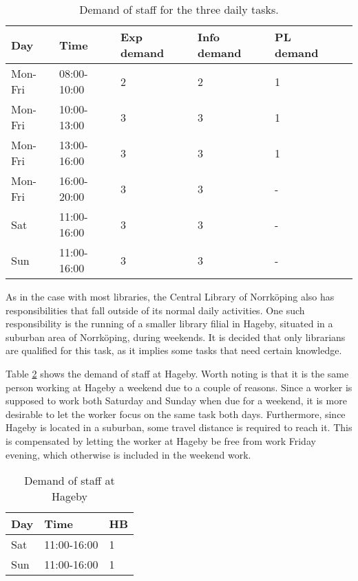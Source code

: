 \begin{table}[h]
\centering
\caption{Demand of staff for the three daily tasks.}
\label{tab:Outer_Task_Demand}
\begin{tabularx}{\textwidth}{|X|l|l|l|l|X|}
\hline
\textbf{Day} & \textbf{Time} & \textbf{Exp demand} & \textbf{Info demand} & \textbf{PL demand}
\\ \hline 
Mon-Fri & 08:00-10:00 & 2 & 2 & 1
\\ \hline 
Mon-Fri & 10:00-13:00 & 3 & 3 & 1
\\ \hline 
Mon-Fri & 13:00-16:00  & 3 & 3 & 1
\\ \hline 
Mon-Fri & 16:00-20:00 & 3 & 3 & -
\\ \hline 
Sat & 11:00-16:00  & 3 & 3 & -
\\ \hline 
Sun & 11:00-16:00  & 3 & 3 & -
\\ \hline 
\end{tabularx}
\end{table} 


As in the case with most libraries, the Central Library of Norrköping also has responsibilities that fall outside of its normal daily activities. One such responsibility is the running of a smaller library filial in Hageby, situated in a suburban area of Norrköping, during weekends. It is decided that only librarians are qualified for this task, as it implies some tasks that need certain knowledge.

Table \ref{tab:Hageby_Demand} shows the demand of staff at Hageby. Worth noting is that it is the same person working at Hageby a weekend due to a couple of reasons. Since a worker is supposed to work both Saturday and Sunday when due for a weekend, it is more desirable to let the worker focus on the same task both days. Furthermore, since Hageby is located in a suburban, some travel distance is required to reach it. This is compensated by letting the worker at Hageby be free from work Friday evening, which otherwise is included in the weekend work. 

\begin{table}[H]
\centering
\caption{Demand of staff at Hageby}
\label{tab:Hageby_Demand}
\begin{tabularx}{0.5\textwidth}{|l|l|X|}
\hline
\textbf{Day} & \textbf{Time} & \textbf{HB}
\\ \hline 
Sat & 11:00-16:00  & 1 
\\ \hline 
Sun & 11:00-16:00  & 1 
\\ \hline 
\end{tabularx}
\end{table} 

